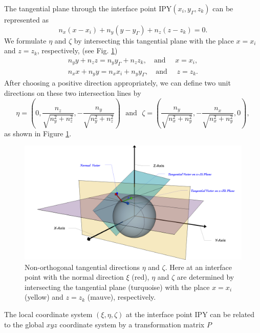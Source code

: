 \documentclass[dissertation]{uathesis}
\begin{document}
\begin{body}
The tangential plane through the interface point IPY$(x_{i},y_{\Gamma},z_{k})$ can be represented as  
%
\begin{equation} \label{tangential_plane}
n_{x}(x-x_{i}) + n_{y}(y-y_{\Gamma}) + n_{z}(z-z_{k}) = 0.
\end{equation}
%
We formulate $\eta$ and $\zeta$ by intersecting this tangential plane with the place $x=x_i$ and $z=z_k$, respectively, (see Fig. \ref{fig:local_coordinate})
%
\begin{align}\label{Intersecting lines}
n_{y}y + n_{z}z = n_{y}y_{\Gamma} + n_{z}z_{k}, \quad \mbox{and } \quad x = x_i, \\
n_{x}x + n_{y}y = n_{x}x_{i} + n_{y}y_{\Gamma}, \quad \mbox{and } \quad z = z_k.
\end{align}
%
After choosing a positive direction appropriately, we can define two unit directions on these two intersection lines by 
%
$$\eta = (0, \frac{n_{z}}{\sqrt{n^{2}_{y}+n^{2}_{z}}}, -\frac{n_{y}}{\sqrt{n^{2}_{y}+n^{2}_{z}}}) ~~~ \mbox{and} ~~~ \zeta = ( \frac{n_{y}}{\sqrt{n^{2}_{x}+n^{2}_{y}}}, -\frac{n_{x}}{\sqrt{n^{2}_{x}+n^{2}_{y}}}, 0 ),$$
%
as shown in Figure \ref{fig:local_coordinate}.
%
\begin{figure}[!tb] 
	\begin{center}
		\includegraphics[width=17cm]{figures/Local-Coordinate.png}
	\end{center}
	\caption{Non-orthogonal tangential directions $\eta$ and $\zeta$. Here at an interface point with
		the normal direction $\xi$ (red), $\eta$ and $\zeta$ are determined by intersecting the tangential plane (turquoise) with the place $x=x_i$ (yellow) and $z=z_k$ (mauve), respectively. 	
	}
	\label{fig:local_coordinate}
\end{figure}
%
The local coordinate system $(\xi,\eta,\zeta)$ at the interface point IPY
can be related to the global $xyz$ coordinate system by a transformation matrix $P$

\end{body}
\end{document}
